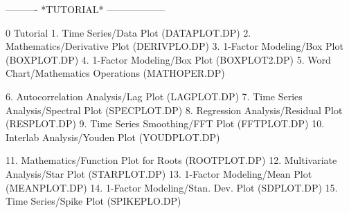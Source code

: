  
 
 
 
 
 
 
 
 
 
 
 
 
 
 
 
 
 
 
 
 
 
 
 
 
 
 
 
 
 
 
 
 
 
 
 
 
 
 
 
 
 
 
 
 
 
 
 
 
 
 
 
 
 
 
 
 
 
 
 
 
 
 
 
 
 
 
 
 
 
 
 
 
 
 
 
 
 
 
 
 
----------  *TUTORIAL*  ------------------
 
0
Tutorial
   1. Time Series/Data Plot (DATAPLOT.DP)
   2. Mathematics/Derivative Plot (DERIVPLO.DP)
   3. 1-Factor Modeling/Box Plot (BOXPLOT.DP)
   4. 1-Factor Modeling/Box Plot (BOXPLOT2.DP)
   5. Word Chart/Mathematics Operations (MATHOPER.DP)
 
   6. Autocorrelation Analysis/Lag Plot (LAGPLOT.DP)
   7. Time Series Analysis/Spectral Plot (SPECPLOT.DP)
   8. Regression Analysis/Residual Plot (RESPLOT.DP)
   9. Time Series Smoothing/FFT Plot (FFTPLOT.DP)
  10. Interlab Analysis/Youden Plot (YOUDPLOT.DP)
 
  11. Mathematics/Function Plot for Roots (ROOTPLOT.DP)
  12. Multivariate Analysis/Star Plot (STARPLOT.DP)
  13. 1-Factor Modeling/Mean Plot (MEANPLOT.DP)
  14. 1-Factor Modeling/Stan. Dev. Plot (SDPLOT.DP)
  15. Time Series/Spike Plot (SPIKEPLO.DP)
 
